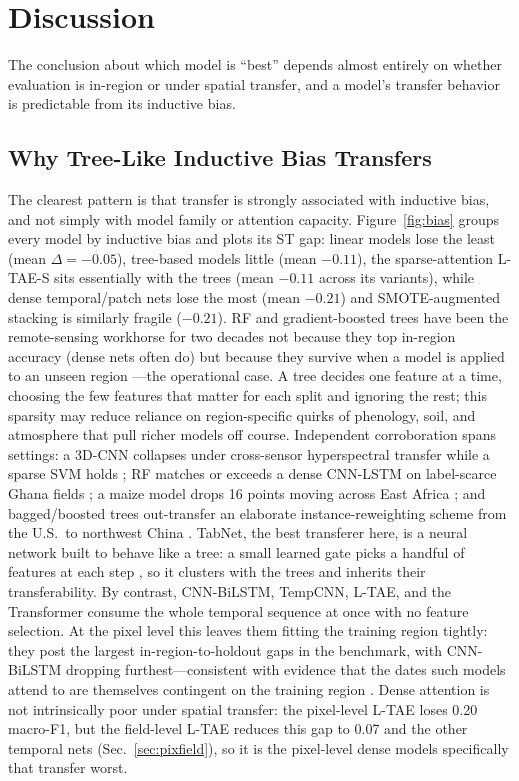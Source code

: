 \documentclass[preprint,authoryear]{elsarticle}
\begin{document}
\section{Discussion}
\label{sec:discussion}
The conclusion about which model is ``best'' depends almost entirely on whether evaluation is in-region or under spatial transfer, and a model's transfer behavior is predictable from its inductive bias.

\subsection{Why Tree-Like Inductive Bias Transfers}
The clearest pattern is that transfer is strongly associated with inductive bias, and not simply with model family or attention capacity. Figure~\ref{fig:bias} groups every model by inductive bias and plots its ST gap: linear models lose the least (mean $\Delta=-0.05$), tree-based models little (mean $-0.11$), the sparse-attention L-TAE-S sits essentially with the trees (mean $-0.11$ across its variants), while dense temporal/patch nets lose the most (mean $-0.21$) and SMOTE-augmented stacking is similarly fragile ($-0.21$). RF and gradient-boosted trees have been the remote-sensing workhorse for two decades not because they top in-region accuracy (dense nets often do) but because they survive when a model is applied to an unseen region \citep{belgiu2016, maxwell2019}---the operational case. A tree decides one feature at a time, choosing the few features that matter for each split and ignoring the rest; this sparsity may reduce reliance on region-specific quirks of phenology, soil, and atmosphere that pull richer models off course. Independent corroboration spans settings: a 3D-CNN collapses under cross-sensor hyperspectral transfer while a sparse SVM holds \citep{pankajakshan2025}; RF matches or exceeds a dense CNN-LSTM on label-scarce Ghana fields \citep{rustowicz2019}; a maize model drops 16 points moving across East Africa \citep{jin2019}; and bagged/boosted trees out-transfer an elaborate instance-reweighting scheme from the U.S.\ to northwest China \citep{mai2025}. TabNet, the best transferer here, is a neural network built to behave like a tree: a small learned gate picks a handful of features at each step \citep{tabnet_orig}, so it clusters with the trees and inherits their transferability. By contrast, CNN-BiLSTM, TempCNN, L-TAE, and the Transformer consume the whole temporal sequence at once with no feature selection. At the pixel level this leaves them fitting the training region tightly: they post the largest in-region-to-holdout gaps in the benchmark, with CNN-BiLSTM dropping furthest---consistent with evidence that the dates such models attend to are themselves contingent on the training region \citep{obadic2022}. Dense attention is not intrinsically poor under spatial transfer: the pixel-level L-TAE loses 0.20 macro-F1, but the field-level L-TAE reduces this gap to 0.07 and the other temporal nets (Sec.~\ref{sec:pixfield}), so it is the pixel-level dense models specifically that transfer worst.
\end{document}
